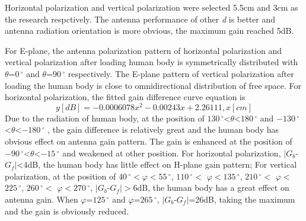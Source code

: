 \documentclass[journal]{IEEEtran}
\begin{document}
Horizontal polarization and vertical polarization were selected 5.5cm and 3cm as the research respctively. The antenna performance of other \textit{d} is better and antenna radiation orientation is more obvious, the maximum gain reached 5dB.

For E-plane, the antenna polarization pattern of horizontal polarization and vertical polarization after loading human body is symmetrically distributed with $\theta$=$0\,^{\circ}$ and $\theta$=$90\,^{\circ}$ respectively. The E-plane pattern of vertical polarization after loading the human body is close to omnidirectional distribution of free space. For horizontal polarization, the fitted gain difference curve equation is
\begin{equation}
\label{eq:eps_10}
y[dB]=-0.0006078x^2-0.00243x+2.26111, x[cm]
\end{equation}
Due to the radiation of human body, at the position of $130\,^{\circ}$\textless$\theta$\textless$180\,^{\circ}$ and $-130\,^{\circ}$\textless$\theta$\textless$-180\,^{\circ}$ , the gain difference is relatively great and the human body has obvious effect on antenna gain pattern. The gain is enhanced at the position of $-90\,^{\circ}$\textless$\theta$\textless$-15\,^{\circ}$ and weakened at other position. For horizontal polarization, $\mid$$G_{b}$-$G_{f}$$\mid$\textless4dB, the human body has little effect on H-plane gain pattern; For vertical polarization, at the position of $40\,^{\circ}$$<$$\varphi$$<$$55\,^{\circ}$, $110\,^{\circ}$$<$ $\varphi$$<$$135\,^{\circ}$, $210\,^{\circ}$$<$ $\varphi$$<$$225\,^{\circ}$, $260\,^{\circ}$$<$ $\varphi$$<$$270\,^{\circ}$, $\mid$$G_{b}$-$G_{f}$$\mid$$>$6dB, the human body has a great effect on antenna gain. When $\varphi$=$125\,^{\circ}$ and $\varphi$=$265\,^{\circ}$, $\mid$$G_{b}$-$G_{f}$$\mid$=26dB, taking the maximum and the gain is obviously reduced.
\end{document}
